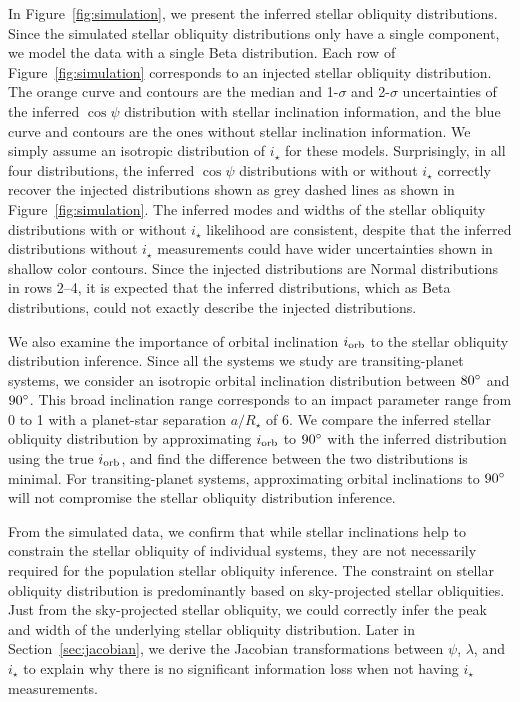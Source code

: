 \documentclass[twocolumn,times]{aastex631}
\begin{document}
In Figure~\ref{fig:simulation}, we present the inferred stellar obliquity distributions. Since the simulated stellar obliquity distributions only have a single component, we model the data with a single Beta distribution. Each row of Figure~\ref{fig:simulation} corresponds to an injected stellar obliquity distribution. The orange curve and contours are the median and 1-$\sigma$ and 2-$\sigma$ uncertainties of the inferred $\cos{\psi}$ distribution with stellar inclination information, and the blue curve and contours are the ones without stellar inclination information. We simply assume an isotropic distribution of $i_\star$ for these models.
Surprisingly, in all four distributions, the inferred $\cos{\psi}$ distributions with or without $i_\star$ correctly recover the injected distributions shown as grey dashed lines as shown in Figure~\ref{fig:simulation}. The inferred modes and widths of the stellar obliquity distributions with or without $i_\star$ likelihood are consistent, despite that the inferred distributions without $i_\star$ measurements could have wider uncertainties shown in shallow color contours.
Since the injected distributions are Normal distributions in rows 2--4, it is expected that the inferred distributions, which as Beta distributions, could not exactly describe the injected distributions.

We also examine the importance of orbital inclination $i_{\rm orb}$ to the stellar obliquity distribution inference. Since all the systems we study are transiting-planet systems, we consider an isotropic orbital inclination distribution between $80\mbox{$^\circ$}$ and $90\mbox{$^\circ$}$. This broad inclination range corresponds to an impact parameter range from 0 to 1 with a planet-star separation $a/R_\star$ of 6.
We compare the inferred stellar obliquity distribution by approximating $i_{\rm orb}$ to $90\mbox{$^\circ$}$ with the inferred distribution using the true $i_{\rm orb}$, and find the difference between the two distributions is minimal. For transiting-planet systems, approximating orbital inclinations to $90\mbox{$^\circ$}$ will not compromise the stellar obliquity distribution inference.

From the simulated data, we confirm that while stellar inclinations help to constrain the stellar obliquity of individual systems, they are not necessarily required for the population stellar obliquity inference. The constraint on stellar obliquity distribution is predominantly based on sky-projected stellar obliquities. Just from the sky-projected stellar obliquity, we could correctly infer the peak and width of the underlying stellar obliquity distribution. Later in Section~\ref{sec:jacobian}, we derive the Jacobian transformations between $\psi$, $\lambda$, and $i_\star$ to explain why there is no significant information loss when not having $i_\star$ measurements.
\end{document}
